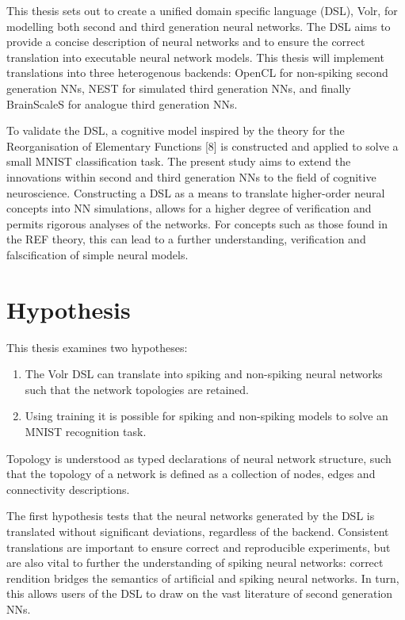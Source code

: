 \documentclass[report.tex]{subfiles}
\begin{document}
This thesis sets out to create a unified domain specific language (DSL), Volr, 
for modelling both second and third generation neural networks.
The DSL aims to provide a concise description of neural networks and to 
ensure the correct translation into executable neural network models.
This thesis will implement translations into three heterogenous backends: 
\gls{OpenCL} for non-spiking second generation \gls{NN}s, NEST for simulated third
generation \gls{NN}s, and finally
BrainScaleS for analogue third generation \gls{NN}s.


To validate the DSL, a cognitive model inspired by the theory for the Reorganisation
of Elementary Functions [8] is constructed and applied to solve a small MNIST classification task.
The present study aims to extend the innovations within
second and third generation \gls{NN}s to the field of
cognitive  neuroscience. 
Constructing a \gls{DSL} as a means to translate higher-order
neural concepts into \gls{NN} simulations, allows for a higher
degree of verification and permits rigorous analyses of the networks.
For concepts such as those found in the \gls{REF} theory, 
this can lead to a further understanding, verification and falscification
of simple neural models.

\section{Hypothesis} \label{ref:hypothesis}
This thesis examines two hypotheses:

\begin{enumerate}
  \item The Volr DSL can translate into spiking and non-spiking neural networks such that the network topologies are retained.
  \item Using training it is possible for spiking and non-spiking models to solve an MNIST recognition task.
\end{enumerate}

Topology is understood as typed declarations of neural network structure, such
that the topology of a network is defined as a collection of nodes, edges and connectivity descriptions.

The first hypothesis tests that the neural networks generated by the DSL is translated without significant
deviations, regardless of the backend.
Consistent translations are important to ensure correct and reproducible experiments,
but are also vital to further the understanding of spiking neural networks:
correct rendition bridges the semantics of artificial and spiking neural networks.
In turn, this allows users of the DSL to draw on the vast literature of
second generation \gls{NN}s.
\end{document}
